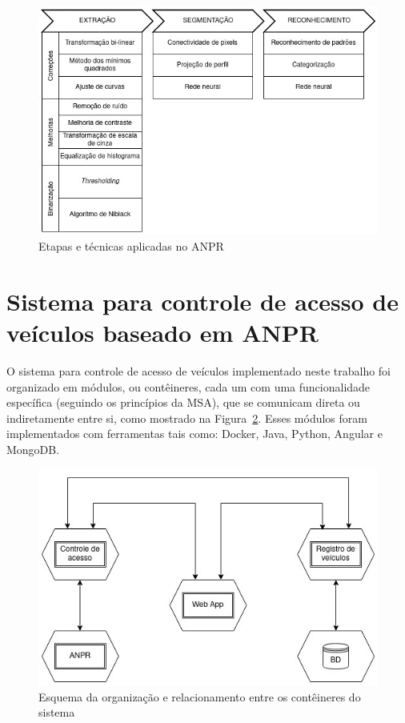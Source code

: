 \documentclass[12pt]{article}
\begin{document}
\begin{figure}[ht]
	\centering
	\includegraphics[width=.8\textwidth]{anpr-steps.jpg}
	\caption{Etapas e técnicas aplicadas no ANPR}
	\label{fig:anpr-steps}
\end{figure} 


\section{Sistema para controle de acesso de veículos baseado em ANPR}

O sistema para controle de acesso de veículos implementado neste trabalho foi organizado em módulos, ou contêineres, cada um com uma funcionalidade específica (seguindo os princípios da MSA), que se comunicam direta ou indiretamente entre si, como mostrado na Figura~\ref{fig:anpr-auth}. Esses módulos foram implementados com ferramentas tais como: Docker, Java, Python, Angular e MongoDB.

\begin{figure}[ht]
	\centering
	\includegraphics[width=.8\textwidth]{anpr-auth.jpg}
	\caption{Esquema da organização e relacionamento entre os contêineres do sistema}
	\label{fig:anpr-auth}
\end{figure}
\end{document}
